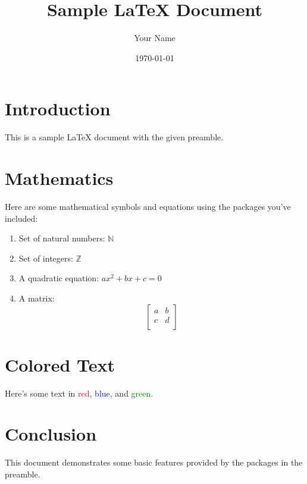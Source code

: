 \documentclass[12pt]{article}
\title{Sample LaTeX Document}
\author{Your Name}
\date{\today}
\begin{document}
\maketitle

\section{Introduction}
This is a sample LaTeX document with the given preamble.

\section{Mathematics}
Here are some mathematical symbols and equations using the packages you've included:

\begin{enumerate}
    \item Set of natural numbers: $\mathbb{N}$
    \item Set of integers: $\mathbb{Z}$
    \item A quadratic equation: $ax^2 + bx + c = 0$
    \item A matrix:
    \[
    \begin{bmatrix}
    a & b \\
    c & d \\
    \end{bmatrix}
    \]
\end{enumerate}

\section{Colored Text}
Here's some text in \textcolor{red}{red}, \textcolor{blue}{blue}, and \textcolor{green}{green}.

\section{Conclusion}
This document demonstrates some basic features provided by the packages in the preamble.
\end{document}

